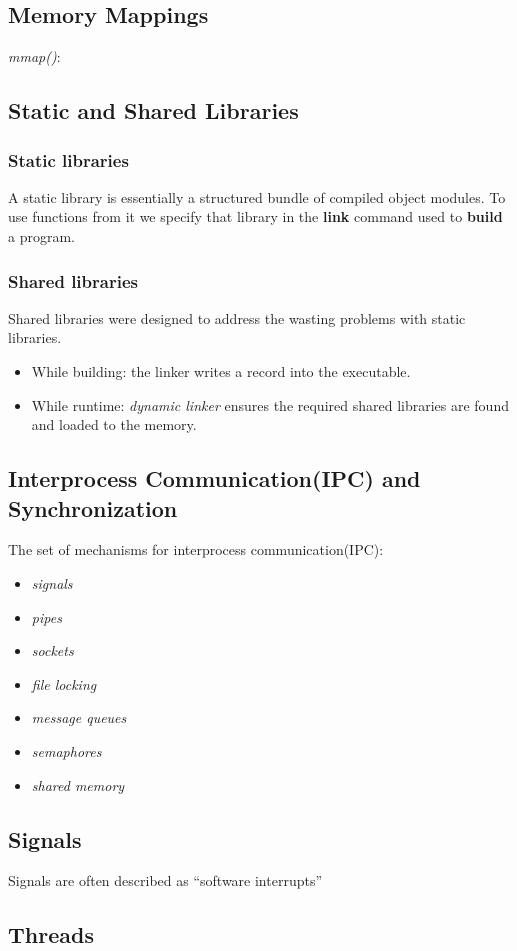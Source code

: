 \documentclass{article}
\begin{document}
\subsection{Memory Mappings}
\textit{mmap()}:




\subsection{Static and Shared Libraries}
\subsubsection*{Static libraries}
A static library is essentially a structured bundle of compiled object modules. To use functions from it we specify that library in the \textbf{link} command used to \textbf{build} a program.
\subsubsection*{Shared libraries}
Shared libraries were designed to address the wasting problems with static libraries.
\begin{itemize}
\item While building: the linker writes a record into the executable.
\item While runtime: \textit{dynamic linker} ensures the required shared libraries are found and loaded to the memory.
\end{itemize}

\subsection{Interprocess Communication(IPC) and Synchronization}
The set of mechanisms for interprocess communication(IPC):
\begin{itemize}
\item \textit{signals}
\item \textit{pipes}
\item \textit{sockets}
\item \textit{file locking}
\item \textit{message queues}
\item \textit{semaphores}
\item \textit{shared memory}
\end{itemize}

\subsection{Signals}
Signals are often described as ``software interrupts''
\subsection{Threads}
\end{document}
